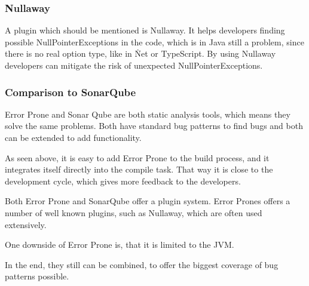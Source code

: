 \subsubsection{Nullaway}
A plugin which should be mentioned is Nullaway.
It helps developers finding possible NullPointerExceptions in the code, which is in Java still a problem, since there is no real option type, like in \.Net or TypeScript.
By using Nullaway developers can mitigate the risk of unexpected NullPointerExceptions.

\subsubsection{Comparison to SonarQube}
Error Prone and Sonar Qube are both static analysis tools, which means they solve the same problems.
Both have standard bug patterns to find bugs and both can be extended to add functionality.

As seen above, it is easy to add Error Prone to the build process, and it integrates itself directly into the compile task.
That way it is close to the development cycle, which gives more feedback to the developers.

Both Error Prone and SonarQube offer a plugin system.
Error Prones offers a number of well known plugins, such as Nullaway, which are often used extensively.

One downside of Error Prone is, that it is limited to the JVM.

In the end, they still can be combined, to offer the biggest coverage of bug patterns possible.
